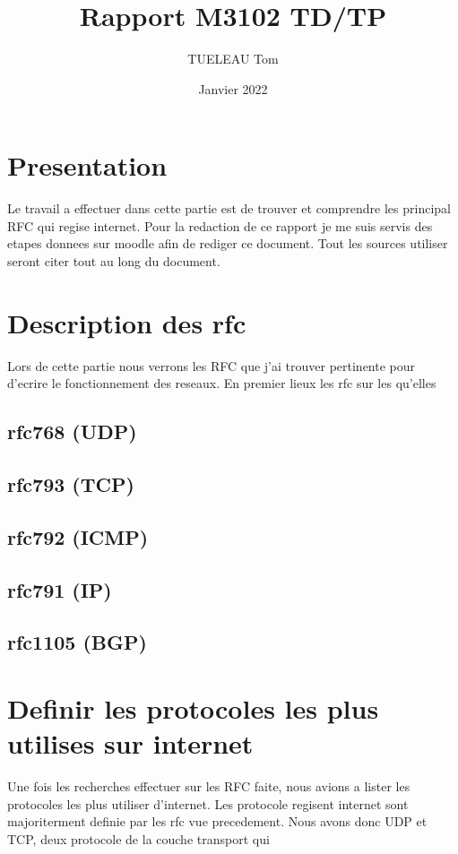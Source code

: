 \documentclass[5pt]{article}
\title{Rapport M3102 TD/TP}
\author{TUELEAU Tom}
\date{Janvier 2022}
\begin{document}
    \maketitle    
    \tableofcontents
    \newpage
    \section{Presentation}
    Le travail a effectuer dans cette partie est de trouver et comprendre les principal RFC qui regise internet. Pour la redaction de ce rapport je me suis servis des etapes donnees sur moodle afin de rediger ce document. Tout les sources utiliser seront citer tout au long du document.
    

    \section{Description des rfc}
    Lors de cette partie nous verrons les RFC que j'ai trouver pertinente pour d'ecrire le fonctionnement des reseaux. En premier lieux les rfc sur les qu'elles 
    \subsection{rfc768 (UDP)}
    \subsection{rfc793 (TCP)}
    \subsection{rfc792 (ICMP)}
    \subsection{rfc791 (IP)}
    \subsection{rfc1105 (BGP)}
    
    \section{Definir les protocoles les plus utilises sur internet}
    Une fois les recherches effectuer sur les RFC faite, nous avions a lister les protocoles les plus utiliser d'internet. Les protocole regisent internet sont majoriterment definie par les rfc vue precedement. Nous avons donc UDP et TCP, deux protocole de la couche transport qui  
    
\end{document}
